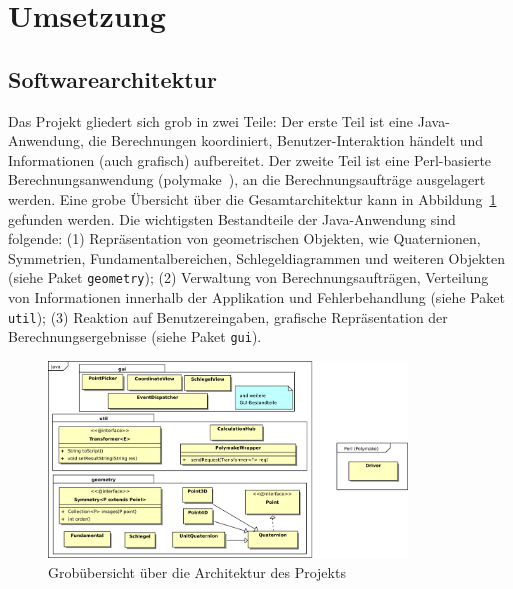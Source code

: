 \section{Umsetzung}
\subsection{Softwarearchitektur}
     Das Projekt gliedert sich grob in zwei Teile: Der erste Teil ist eine Java-Anwendung, die Berechnungen koordiniert, Benutzer-Interaktion händelt und Informationen
     (auch grafisch) aufbereitet. Der zweite Teil ist eine Perl-basierte Berechnungsanwendung (polymake~\cite{polymake}), an die Berechnungsaufträge ausgelagert werden.
     Eine grobe Übersicht über die Gesamtarchitektur kann in Abbildung~\ref{fig:architecture} gefunden werden.
     Die wichtigsten Bestandteile der Java-Anwendung sind folgende: (1) Repräsentation von geometrischen Objekten, wie Quaternionen, Symmetrien,
     Fundamentalbereichen, Schlegeldiagrammen und weiteren Objekten (siehe Paket \texttt{geometry}); (2) Verwaltung von Berechnungsaufträgen, Verteilung von Informationen innerhalb
     der Applikation und Fehlerbehandlung (siehe Paket \texttt{util}); (3) Reaktion auf Benutzereingaben, grafische Repräsentation der Berechnungsergebnisse (siehe Paket \texttt{gui}).

     \begin{figure}[tbh]
            \centering
            \includegraphics[width=0.85\textwidth]{img/architecture}
            \caption{Grobübersicht über die Architektur des Projekts\label{fig:architecture}}
        \end{figure}

